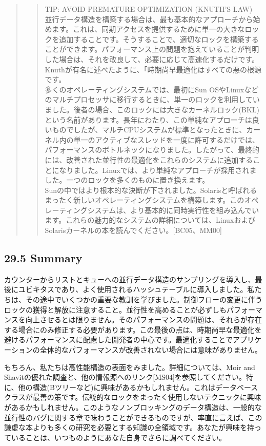 \begin{quote}
\begin{quote}
TIP: AVOID PREMATURE OPTIMIZATION (KNUTH'S LAW)\\
並行データ構造を構築する場合は、最も基本的なアプローチから始めます。これは、同期アクセスを提供するために単一の大きなロックを追加することです。そうすることで、適切なロックを構築することができます。パフォーマンス上の問題を抱えていることが判明した場合は、それを改良して、必要に応じて高速化するだけです。Knuthが有名に述べたように、「時期尚早最適化はすべての悪の根源です。\\
多くのオペレーティングシステムでは、最初にSun
OSやLinuxなどのマルチプロセッサに移行するときに、単一のロックを利用していました。後者の場合、このロックには大きなカーネルロック(BKL)という名前があります。長年にわたり、この単純なアプローチは良いものでしたが、マルチCPUシステムが標準となったときに、カーネル内の単一のアクティブなスレッドを一度に許可するだけでは、パフォーマンスのボトルネックになりました。したがって、最終的には、改善された並行性の最適化をこれらのシステムに追加することになりました。Linuxでは、より単純なアプローチが採用されました。一つのロックを多くのものに置き換えます。\\
Sunの中ではより根本的な決断が下されました。Solarisと呼ばれるまったく新しいオペレーティングシステムを構築します。このオペレーティングシステムは、より基本的に同時実行性を組み込んでいます。これらの魅力的なシステムの詳細については、LinuxおよびSolarisカーネルの本を読んでください。{[}BC05、MM00{]}
\end{quote}
\end{quote}

\hypertarget{summary-18}{%
\subsection*{29.5 Summary}\label{summary-18}}

カウンターからリストとキューへの並行データ構造のサンプリングを導入し、最後にユビキタスであり、よく使用されるハッシュテーブルに導入しました。私たちは、その途中でいくつかの重要な教訓を学びました。制御フローの変更に伴うロックの獲得と解放に注意すること。並行性を高めることが必ずしもパフォーマンスを向上させるとは限りません。そのパフォーマンスの問題は、それらが存在する場合にのみ修正する必要があります。この最後の点は、時期尚早な最適化を避けるパフォーマンスに配慮した開発者の中心です。最適化することでアプリケーションの全体的なパフォーマンスが改善されない場合には意味がありません。

もちろん、私たちは高性能構造の表面をみました。詳細については、Moir and
Shavitの優れた調査と、他の情報源へのリンク{[}MS04{]}を参照してください。特に、他の構造(Bツリーなど)に興味があるかもしれません。これはデータベースクラスが最善の策です。伝統的なロックをまったく使用しないテクニックに興味があるかもしれません。このようなノンブロッキングのデータ構造は、一般的な並行性のバグに関する章で味わうことができるものですが、率直に言えば、この謙虚な本よりも多くの研究を必要とする知識の全領域です。あなたが興味を持っていることは、いつものようにあなた自身でさらに調べてください。

